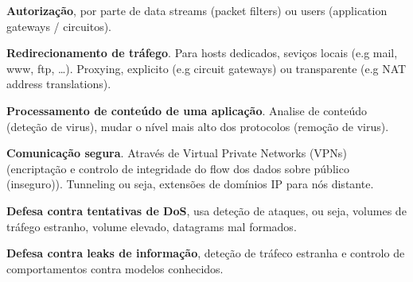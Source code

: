 \documentclass{article}
\begin{document}
\begin{flushleft}
  \textbf{Autorização}, por parte de data streams (packet filters) ou
  users (application gateways / circuitos).

  \vspace{2mm}

  \textbf{Redirecionamento de tráfego}. Para hosts dedicados, seviços locais
  (e.g mail, www, ftp, \dots). Proxying, explicito (e.g circuit gateways) ou
  transparente (e.g NAT address translations).

  \vspace{2mm}

  \textbf{Processamento de conteúdo de uma aplicação}. Analise de conteúdo (deteção de
  virus), mudar o nível mais alto dos protocolos (remoção de virus).

  \vspace{2mm}

  \textbf{Comunicação segura}. Através de Virtual Private Networks (VPNs) (encriptação
  e controlo de integridade do flow dos dados sobre público (inseguro)). Tunneling ou seja,
  extensões de domínios IP para nós distante.
  
  \vspace{2mm}

  \textbf{Defesa contra tentativas de DoS}, usa deteção de ataques,
  ou seja, volumes de tráfego estranho, volume elevado, datagrams mal formados.

  \vspace{2mm}

  \textbf{Defesa contra leaks de informação}, deteção de tráfeco estranha e
  controlo de comportamentos contra modelos conhecidos.
\end{flushleft}
\end{document}

